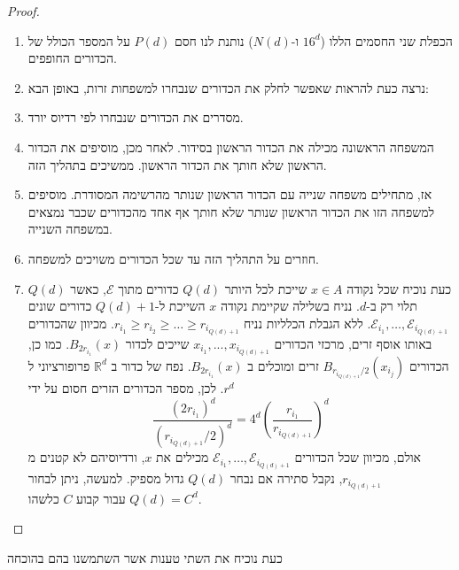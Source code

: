\documentclass{tstextbook}
\begin{document}
\begin{proof}
\begin{enumerate}
    \item הכפלת שני החסמים הללו (\(16^d\) ו-\(N(d)\)) נותנת לנו חסם \(P(d)\) על המספר הכולל של הכדורים החופפים. 


    \item נרצה כעת להראות שאפשר לחלק את הכדורים שנבחרו למשפחות זרות, באופן הבא: 


    \item מסדרים את הכדורים שנבחרו לפי רדיוס יורד.    
    \item המשפחה הראשונה מכילה את הכדור הראשון בסידור. לאחר מכן, מוסיפים את הכדור הראשון שלא חותך את הכדור הראשון. ממשיכים בתהליך הזה.
    \item אז, מתחילים משפחה שנייה עם הכדור הראשון שנותר מהרשימה המסודרת. מוסיפים למשפחה הזו את הכדור הראשון שנותר שלא חותך אף אחד מהכדורים שכבר נמצאים במשפחה השנייה.
    \item חוזרים על התהליך הזה עד שכל הכדורים משויכים למשפחה.


    \item כעת נוכיח שכל נקודה \(x \in A\) שייכת לכל היותר \(Q(d)\) כדורים מתוך \(\mathcal{E}\), כאשר \(Q(d)\) תלוי רק ב-\(d\). נניח בשלילה שקיימת נקודה \(x\) השייכת ל-\(Q(d)+1\) כדורים שונים \(\mathcal{E}_{i_1},\dots,\mathcal{E}_{i_{Q(d)+1}}\). ללא הגבלת הכלליות נניח \(r_{i_1} \ge r_{i_2} \ge \dots \ge r_{i_{Q(d)+1}}\). מכיוון שהכדורים באותו אוסף זרים, מרכזי הכדורים \(x_{i_1},...,x_{i_{Q(d)+1}}\) שייכים לכדור \(B_{2r_{i_1}}(x)\). כמו כן, הכדורים \(B_{r_{i_{Q(d)+1}}/2}(x_{i_j})\) זרים ומוכלים ב \(B_{2r_{i_1}}(x)\). 
נפח של כדור ב \(\mathbb{R}^d\) פרופורציוני ל \(r^d\). לכן, מספר הכדורים הזרים חסום על ידי
$$ \frac{(2r_{i_1})^d}{(r_{i_{Q(d)+1}}/2)^d} = 4^d (\frac{r_{i_1}}{r_{i_{Q(d)+1}}})^d $$
אולם, מכיוון שכל הכדורים \(\mathcal{E}_{i_1},\dots,\mathcal{E}_{i_{Q(d)+1}}\) מכילים את \(x\), ורדיוסיהם לא קטנים מ \(r_{i_{Q(d)+1}}\), נקבל סתירה אם נבחר \(Q(d)\) גדול מספיק. למעשה, ניתן לבחור \(Q(d) = C^d\) עבור קבוע \(C\) כלשהו.


  \end{enumerate}
\end{proof}
כעת נוכיח את השתי טענות אשר השתמשנו בהם בהוכחה
\end{document}
